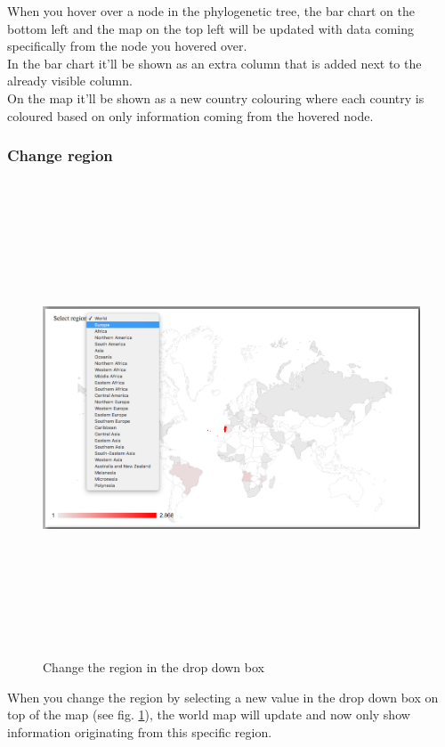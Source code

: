 \documentclass[a4paper, 11pt]{article} %
\begin{document}
When you hover over a node in the phylogenetic tree, the bar chart on the bottom left and the map on the top left will be updated with data coming specifically from the node you hovered over.
\\
In the bar chart it'll be shown as an extra column that is added next to the already visible column.
\\
On the map it'll be shown as a new country colouring where each country is coloured based on only information coming from the hovered node.

\subsubsection{Change region}
\begin{figure}[H]
\centering
\includegraphics[width=400pt, height=400pt, keepaspectratio=true]{images/change_country.PNG}
\caption{Change the region in the drop down box}
\label{fig:change_region}
\end{figure}
When you change the region by selecting a new value in the drop down box on top of the map (see fig. \ref{fig:change_region}), the world map will update and now only show information originating from this specific region.
\end{document}
